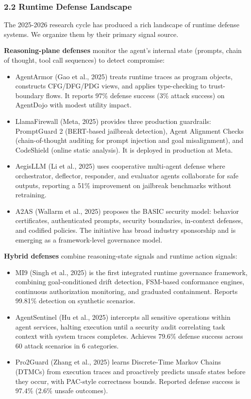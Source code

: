 \documentclass[
]{article}
\providecommand{\tightlist}{%
  \setlength{\itemsep}{0pt}\setlength{\parskip}{0pt}}
\begin{document}
\subsubsection{2.2 Runtime Defense
Landscape}\label{runtime-defense-landscape}

The 2025-2026 research cycle has produced a rich landscape of runtime
defense systems. We organize them by their primary signal source.

\textbf{Reasoning-plane defenses} monitor the agent's internal state
(prompts, chain of thought, tool call sequences) to detect compromise:

\begin{itemize}
\tightlist
\item
  AgentArmor (Gao et al., 2025) treats runtime traces as program
  objects, constructs CFG/DFG/PDG views, and applies type-checking to
  trust-boundary flows. It reports 97\% defense success (3\% attack
  success) on AgentDojo with modest utility impact.
\item
  LlamaFirewall (Meta, 2025) provides three production guardrails:
  PromptGuard 2 (BERT-based jailbreak detection), Agent Alignment Checks
  (chain-of-thought auditing for prompt injection and goal
  misalignment), and CodeShield (online static analysis). It is deployed
  in production at Meta.
\item
  AegisLLM (Li et al., 2025) uses cooperative multi-agent defense where
  orchestrator, deflector, responder, and evaluator agents collaborate
  for safe outputs, reporting a 51\% improvement on jailbreak benchmarks
  without retraining.
\item
  A2AS (Wallarm et al., 2025) proposes the BASIC security model:
  behavior certificates, authenticated prompts, security boundaries,
  in-context defenses, and codified policies. The initiative has broad
  industry sponsorship and is emerging as a framework-level governance
  model.
\end{itemize}

\textbf{Hybrid defenses} combine reasoning-state signals and runtime
action signals:

\begin{itemize}
\tightlist
\item
  MI9 (Singh et al., 2025) is the first integrated runtime governance
  framework, combining goal-conditioned drift detection, FSM-based
  conformance engines, continuous authorization monitoring, and
  graduated containment. Reports 99.81\% detection on synthetic
  scenarios.
\item
  AgentSentinel (Hu et al., 2025) intercepts all sensitive operations
  within agent services, halting execution until a security audit
  correlating task context with system traces completes. Achieves 79.6\%
  defense success across 60 attack scenarios in 6 categories.
\item
  Pro2Guard (Zhang et al., 2025) learns Discrete-Time Markov Chains
  (DTMCs) from execution traces and proactively predicts unsafe states
  before they occur, with PAC-style correctness bounds. Reported defense
  success is 97.4\% (2.6\% unsafe outcomes).
\end{itemize}
\end{document}

